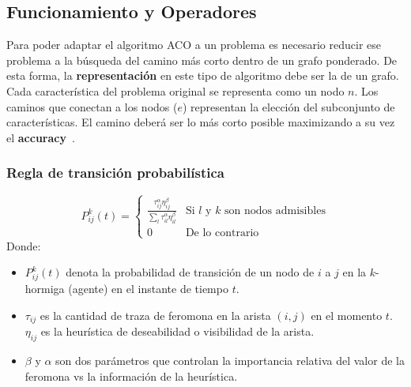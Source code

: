 \subsection{Funcionamiento y Operadores}
Para poder adaptar el algoritmo ACO a un problema es necesario reducir ese problema a la búsqueda del camino más corto dentro de un grafo ponderado. De esta forma, la \textbf{representación} en este tipo de algoritmo debe ser la de un grafo.
Cada característica del problema original se representa como un nodo $n$. Los caminos que conectan a los nodos ($e$) representan la elección del subconjunto de características. El camino deberá ser lo más corto posible maximizando a su vez el \textbf{accuracy}~\cite{kashef_advanced_2015}.

\subsubsection{Regla de transición probabilística}
\begin{equation}
    P_{ij}^k(t)=\begin{cases} \frac{\tau_{ij}^{\alpha}\eta_{ij}^{\beta}}{\sum_l\tau_{il}^{\alpha}\eta_{il}^{\beta}} & \text{Si $l$ y $k$ son nodos admisibles} \\ 0 & \text{De lo contrario} \end{cases}
\end{equation}
Donde:
\begin{itemize}
    \item $P_{ij}^k(t)$ denota la probabilidad de transición de un nodo de $i$ a $j$ en la $k$-hormiga (agente) en el instante de tiempo $t$.
    \item $\tau_{ij}$ es la cantidad de traza de feromona en la arista $(i,j)$ en el momento $t$. $\eta_{ij}$ es la heurística de deseabilidad o visibilidad de la arista.
    \item $\beta$ y $\alpha$ son dos parámetros que controlan la importancia relativa del valor de la feromona vs la información de la heurística.
\end{itemize}


